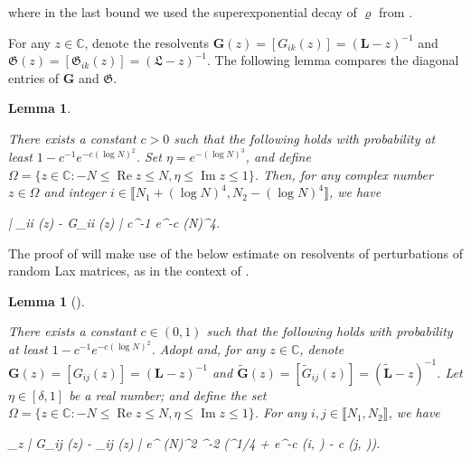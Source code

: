 \documentclass{amsart}
\numberwithin{equation}{section}
\DeclareMathOperator{\Imaginary}{Im}
\DeclareMathOperator{\Real}{Re}
\DeclareMathOperator{\dist}{dist}
\newtheorem{lem}[thm]{Lemma}
\theoremstyle{remark}
\theoremstyle{definition}
\begin{document}
	\noindent where in the last bound we used the superexponential decay of $\varrho$ from .
	
	For any $z \in \mathbb{C}$, denote the resolvents $\bm{G}(z) = [G_{ik} (z)] = (\bm{L}-z)^{-1}$ and $\bm{\mathfrak{G}} (z) = [\mathfrak{G}_{ik} (z)] = (\bm{\mathfrak{L}} - z)^{-1}$. The following lemma compares the diagonal entries of $\bm{G}$ and $\bm{\mathfrak{G}}$.  
	
	\begin{lem} 
		
		\label{glambda2}
		
		There exists a constant $c>0$ such that the following holds with probability at least $1 - c^{-1} e^{-c(\log N)^2}$. Set $\eta = e^{-(\log N)^3}$, and define $\Omega = \{ z \in \mathbb{C}: -N \le \Real z \le N, \eta \le \Imaginary z \le 1 \}$. Then, for any complex number $z \in \Omega$ and integer $i \in \llbracket N_1 + (\log N)^4, N_2 - (\log N)^4 \rrbracket$, we have
		\begin{flalign*}
			| _{ii} (z) - G_{ii} (z) | \le c^{-1} e^{-c (\log N)^4}.
		\end{flalign*}
	\end{lem} 
	
	
	The proof of  will make use of the below estimate on resolvents of perturbations of random Lax matrices, as in the context of . 


	
	\begin{lem}[{\cite[Lemma 5.4]{LC}}]
		
		\label{lgdifference}
		
		There exists a constant $c \in (0,1)$ such that the following holds with probability at least $1 - c^{-1} e^{-c(\log N)^2}$. Adopt  and, for any $z \in  \mathbb{C}$, denote $\bm{G}(z) = [ G_{ij} (z) ] = (\bm{L} - z)^{-1}$ and $\tilde{\bm{G}} (z) = [ \tilde{G}_{ij} (z) ] = (\tilde{\bm{L}} - z)^{-1}$. Let $\eta \in [\delta, 1]$ be a real number; and define the set $\Omega = \{ z \in \mathbb{C} : -N \le \Real z \le N, \eta \le \Imaginary z \le 1 \}$. For any $i, j \in \llbracket N_1, N_2 \rrbracket$, we have 
		\begin{flalign}
			\label{gkke} 
			\displaystyle\sup_{z \in \Omega} | G_{ij} (z) - _{ij} (z) | \le e^{ (\log N)^2} \eta^{-2} (\delta^{1/4} + e^{-c \dist (i, ) - c \dist (j, )}).
		\end{flalign}
		
	\end{lem} 
	
\end{document}
